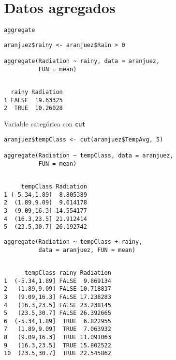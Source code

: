 \documentclass[xcolor={usenames,svgnames,dvipsnames}]{beamer}
\begin{document}
\section{Datos agregados}
\label{sec:org1bbf45d}

\begin{frame}[label={sec:org04bde19},fragile]{\texttt{aggregate}}
 \lstset{language=r,label= ,caption= ,captionpos=b,numbers=none}
\begin{lstlisting}
aranjuez$rainy <- aranjuez$Rain > 0

aggregate(Radiation ~ rainy, data = aranjuez,
          FUN = mean)
\end{lstlisting}

\begin{verbatim}

  rainy Radiation
1 FALSE  19.63325
2  TRUE  10.26028
\end{verbatim}
\end{frame}

\begin{frame}[label={sec:orgc9378ff},fragile]{Variable categórica con \texttt{cut}}
 \lstset{language=r,label= ,caption= ,captionpos=b,numbers=none}
\begin{lstlisting}
aranjuez$tempClass <- cut(aranjuez$TempAvg, 5)

aggregate(Radiation ~ tempClass, data = aranjuez,
          FUN = mean)
\end{lstlisting}

\begin{verbatim}

     tempClass Radiation
1 (-5.34,1.89]  8.805389
2  (1.89,9.09]  9.014178
3  (9.09,16.3] 14.554177
4  (16.3,23.5] 21.912414
5  (23.5,30.7] 26.192742
\end{verbatim}


\lstset{language=r,label= ,caption= ,captionpos=b,numbers=none}
\begin{lstlisting}
aggregate(Radiation ~ tempClass + rainy,
          data = aranjuez, FUN = mean)
\end{lstlisting}

\begin{verbatim}

      tempClass rainy Radiation
1  (-5.34,1.89] FALSE  9.869134
2   (1.89,9.09] FALSE 10.718837
3   (9.09,16.3] FALSE 17.238283
4   (16.3,23.5] FALSE 23.238145
5   (23.5,30.7] FALSE 26.392665
6  (-5.34,1.89]  TRUE  6.822955
7   (1.89,9.09]  TRUE  7.063932
8   (9.09,16.3]  TRUE 11.091063
9   (16.3,23.5]  TRUE 15.802522
10  (23.5,30.7]  TRUE 22.545862
\end{verbatim}
\end{frame}
\end{document}
